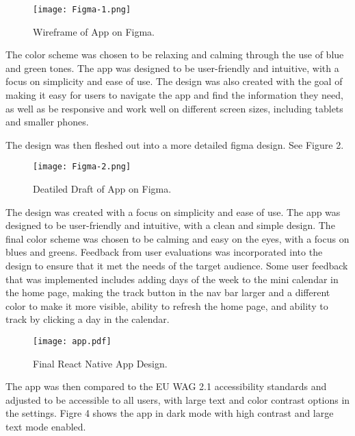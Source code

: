 \begin{figure}[h!!]
  \begin{center}
    \texttt{[image: Figma-1.png]}
    \caption{Wireframe of App on Figma.}
    \label{figure:figma-1}
  \end{center}
\end{figure}

The color scheme was chosen to be relaxing and calming  through the use of blue and green tones. The app was designed to be user-friendly and intuitive, with a focus on simplicity and ease of use. The design was also created with the goal of making it easy for users to navigate the app and find the information they need, as well as be responsive and work well on different screen sizes, including tablets and smaller phones.  

The design was then fleshed out into a more detailed figma design. See Figure 2.

\begin{figure}[h!!]
  \begin{center}
    \texttt{[image: Figma-2.png]}
    \caption{Deatiled Draft of App on Figma.}
    \label{figure:figma-2}
  \end{center}
\end{figure}

The design was created with a focus on simplicity and ease of use. The app was designed to be user-friendly and intuitive, with a clean and simple design. The final color scheme was chosen to be calming and easy on the eyes, with a focus on blues and greens. Feedback from user evaluations was incorporated into the design to ensure that it met the needs of the target audience. Some user feedback that was implemented includes adding days of the week to the mini calendar in the home page, making the track button in the nav bar larger and a different color to make it more visible, ability to refresh the home page, and ability to track by clicking a day in the calendar. 

\begin{figure}[h!!]
  \begin{center}
    \texttt{[image: app.pdf]}
    \caption{Final React Native App Design.}
    \label{figure:app}
  \end{center}
\end{figure}


The app was then compared to the EU WAG 2.1 accessibility standards and adjusted to be accessible to all users, with large text and color contrast options in the settings. Figre 4 shows the app in dark mode with high contrast and large text mode enabled.
 

